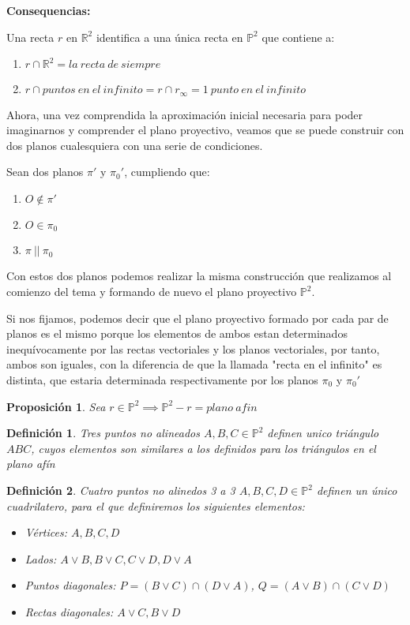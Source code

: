 \documentclass[11pt, a4paper, titlepage]{article}
\theoremstyle{theorem-style}
\newtheorem{nprop}{Proposición}[section]
\theoremstyle{definition-style}
\newtheorem{ndef}{Definición}[section]
\theoremstyle{remark-style}
\theoremstyle{example-style}
\newenvironment{nlist}
{\begin{enumerate}
    \renewcommand\labelenumi{(\emph{\roman{enumi})}}}
  {\end{enumerate}}
\begin{document}
\textbf{Consequencias:}

Una recta $r$ en $\mathbb{R}^2$ identifica a una única recta en $\mathbb{P}^2$ que contiene a:
\begin{nlist}

	\item $r \cap \mathbb{R}^2 = la\ recta\ de\ siempre$ 
	\item $r \cap {puntos\ en\ el\ infinito} = r \cap r_\infty = 1\ punto\ en\ el\ infinito$

\end{nlist}

Ahora, una vez comprendida la aproximación inicial necesaria para poder imaginarnos y comprender el plano proyectivo, veamos que se puede construir con dos planos cualesquiera con una serie de condiciones.


Sean dos planos $\pi'$ y $\pi_0'$, cumpliendo que:
\begin{nlist}
	\item $O \notin \pi'$
	\item $O \in \pi_0$
	\item $\pi\ ||\ \pi_0$ 
\end{nlist}
Con estos dos planos podemos realizar la misma construcción que realizamos al comienzo del tema y formando de nuevo el plano proyectivo $\mathbb{P}^2$. 

Si nos fijamos, podemos decir que el plano proyectivo formado por cada par de planos es el mismo porque los elementos de ambos estan determinados inequívocamente por las rectas vectoriales y los planos vectoriales, por tanto, ambos son iguales, con la diferencia de que la llamada "recta en el infinito" es distinta, que estaria determinada respectivamente por los planos $\pi_0$ y $\pi_0'$

\begin{nprop}
Sea $r \in \mathbb{P}^2 \implies \mathbb{P}^2 - r = plano\ afin$
\end{nprop}

\begin{ndef}
Tres puntos no alineados $A,B,C \in \mathbb{P}^2$ definen unico triángulo $ABC$, cuyos elementos son similares a los definidos para los triángulos en el plano afín
\end{ndef}

\begin{ndef}
Cuatro puntos no alinedos 3 a 3 $A,B,C,D \in \mathbb{P}^2$ definen un único cuadrilatero, para el que definiremos los siguientes elementos:
\begin{itemize}
	\item Vértices: $A, B, C, D$
	\item Lados: $A\vee B, B\vee C, C\vee D, D\vee A$
	\item Puntos diagonales: $P = (B\vee C) \cap (D\vee A)$, $Q = (A\vee B) \cap (C\vee D)$ 
	\item Rectas diagonales: $A\vee C, B\vee D$
\end{itemize} 
\end{ndef}
\end{document}
